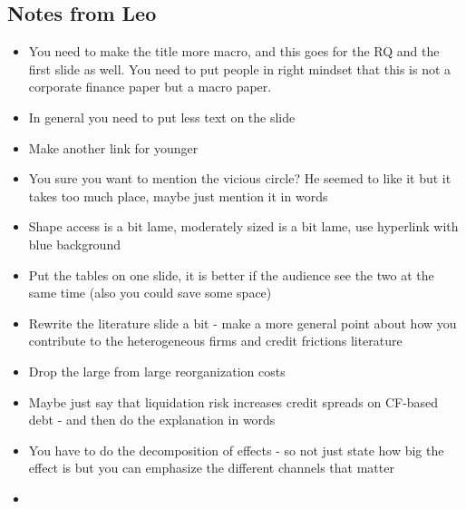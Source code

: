 \documentclass[12pt]{article}
\begin{document}
\subsection*{Notes from Leo} 
\begin{itemize} \setlength\itemsep{0em}  \small
    \item You need to make the title more macro, and this goes for the RQ and the first slide as well. You need to put people in right mindset that this is not a corporate finance paper but a macro paper.
    \item In general you need to put less text on the slide
    \item Make another link for younger
    \item You sure you want to mention the vicious circle? He seemed to like it but it takes too much place, maybe just mention it in words
    \item Shape access is a bit lame, moderately sized is a bit lame, use hyperlink with blue background
    \item Put the tables on one slide, it is better if the audience see the two at the same time (also you could save some space)
    \item Rewrite the literature slide a bit - make a more general point about how you contribute to the heterogeneous firms and credit frictions literature
    \item Drop the large from large reorganization costs
    \item Maybe just say that liquidation risk increases credit spreads on CF-based debt - and then do the explanation in words
    \item You have to do the decomposition of effects - so not just state how big the effect is but you can emphasize the different channels that matter
    \item 
    
\end{itemize} \normalsize




\newpage
\end{document}
